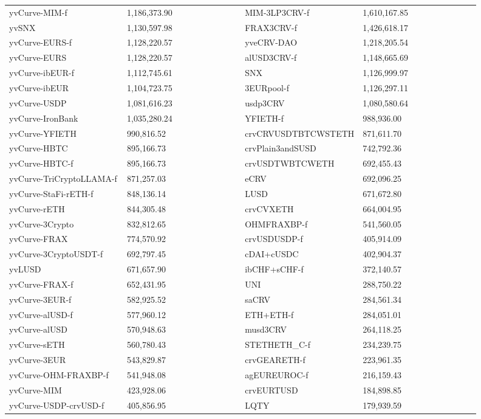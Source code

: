 \begin{longtable}{@{}p{0.25\linewidth}p{0.25\linewidth}p{0.25\linewidth}p{0.25\linewidth}@{}}
yvCurve-MIM-f & 1,186,373.90 & MIM-3LP3CRV-f &1,610,167.85 \\
yvSNX & 1,130,597.98 & FRAX3CRV-f &1,426,618.17 \\
yvCurve-EURS-f & 1,128,220.57 & yveCRV-DAO &1,218,205.54 \\
yvCurve-EURS & 1,128,220.57 & alUSD3CRV-f &1,148,665.69 \\
yvCurve-ibEUR-f & 1,112,745.61 & SNX &1,126,999.97 \\
yvCurve-ibEUR & 1,104,723.75 & 3EURpool-f &1,126,297.11 \\
yvCurve-USDP & 1,081,616.23 & usdp3CRV &1,080,580.64 \\
yvCurve-IronBank & 1,035,280.24 & YFIETH-f &988,936.00 \\
yvCurve-YFIETH & 990,816.52 & crvCRVUSDTBTCWSTETH &871,611.70 \\
yvCurve-HBTC & 895,166.73 & crvPlain3andSUSD &742,792.36 \\
yvCurve-HBTC-f & 895,166.73 & crvUSDTWBTCWETH &692,455.43 \\
yvCurve-TriCryptoLLAMA-f & 871,257.03 & eCRV &692,096.25 \\
yvCurve-StaFi-rETH-f & 848,136.14 & LUSD &671,672.80 \\
yvCurve-rETH & 844,305.48 & crvCVXETH &664,004.95 \\
yvCurve-3Crypto & 832,812.65 & OHMFRAXBP-f &541,560.05 \\
yvCurve-FRAX & 774,570.92 & crvUSDUSDP-f &405,914.09 \\
yvCurve-3CryptoUSDT-f & 692,797.45 & cDAI+cUSDC &402,904.37 \\
yvLUSD & 671,657.90 & ibCHF+sCHF-f &372,140.57 \\
yvCurve-FRAX-f & 652,431.95 & UNI &288,750.22 \\
yvCurve-3EUR-f & 582,925.52 & saCRV &284,561.34 \\
yvCurve-alUSD-f & 577,960.12 & ETH+ETH-f &284,051.01 \\
yvCurve-alUSD & 570,948.63 & musd3CRV &264,118.25 \\
yvCurve-sETH & 560,780.43 & STETHETH_C-f &234,239.75 \\
yvCurve-3EUR & 543,829.87 & crvGEARETH-f &223,961.35 \\
yvCurve-OHM-FRAXBP-f & 541,948.08 & agEUREUROC-f &216,159.43 \\
yvCurve-MIM & 423,928.06 & crvEURTUSD &184,898.85 \\
yvCurve-USDP-crvUSD-f & 405,856.95 & LQTY &179,939.59 \\

\end{longtable}
